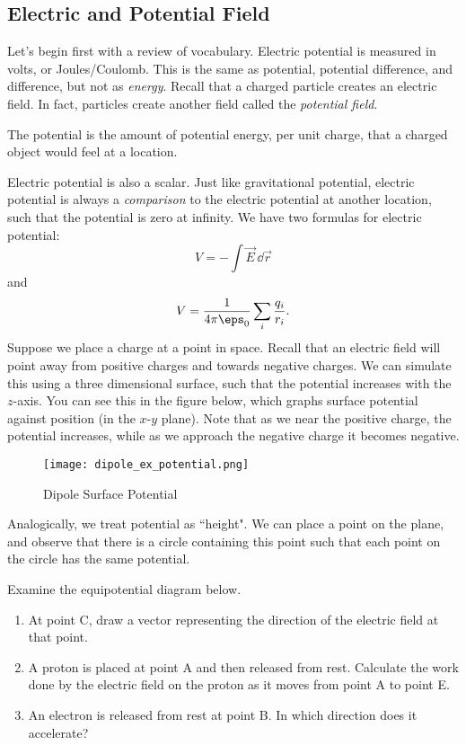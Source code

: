 \documentclass[11pt]{article}
\begin{document}
\subsection{Electric and Potential Field}
Let's begin first with a review of vocabulary. Electric potential is measured in volts, or Joules/Coulomb. This is the same as potential, potential difference, and difference, but not as \textit{energy}. Recall that a charged particle creates an electric field. In fact, particles create another field called the \textit{potential field}.
\begin{defn}
    The potential is the amount of potential energy, per unit charge, that a charged object would feel at a location.
\end{defn}
Electric potential is also a scalar. Just like gravitational potential, electric potential is always a \textit{comparison} to the electric potential at another location, such that the potential is zero at infinity. We have two formulas for electric potential:
\begin{equation}
    V = - \int \vec{E}\,\dd \vec{r}
\end{equation}
and
\begin{equation}
    V = \frac{1}{4\pi\eps_0}\sum_i \frac{q_i}{r_i}.
\end{equation}
Suppose we place a charge at a point in space. Recall that an electric field will point away from positive charges and towards negative charges. We can simulate this using a three dimensional surface, such that the potential increases with the $z$-axis. You can see this in the figure below, which graphs surface potential against position (in the $x$-$y$ plane). Note that as we near the positive charge, the potential increases, while as we approach the negative charge it becomes negative.

\begin{figure}[H]
    \centering
    \texttt{[image: dipole\_ex\_potential.png]}
    \caption{Dipole Surface Potential}
\end{figure}

Analogically, we treat potential as ``height". We can place a point on the plane, and observe that there is a circle containing this point such that each point on the circle has the same potential.

\begin{example}[AP 2016]\label{potentialex1}
    Examine the equipotential diagram below.
    \begin{enumerate}\setlength\itemsep{0pt}
        \item At point C, draw a vector representing the direction of the electric field at that point.
        \item A proton is placed at point A and then released from rest. Calculate the work done by the electric field on the proton as it moves from point A to point E.
        \item An electron is released from rest at point B. In which direction does it accelerate?
    \end{enumerate}
\end{example}
\end{document}
